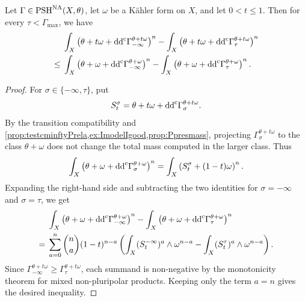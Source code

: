 \begin{lemma}\label{lma:NA_mass_drop_transition}
    Let $\Gamma\in \mathrm{PSH}^{\mathrm{NA}}(X,\theta)$, let $\omega$ be a Kähler form on $X$, and let $0<t\leq 1$. Then for every $\tau<\Gamma_{\max}$, we have
    \[
    \begin{aligned}
    &\int_X \left(\theta+t\omega+\mathrm{dd}^{\mathrm{c}}\Gamma^{\theta+t\omega}_{-\infty}\right)^n-\int_X \left(\theta+t\omega+\mathrm{dd}^{\mathrm{c}}\Gamma^{\theta+t\omega}_{\tau}\right)^n\\
    \leq{}&\int_X \left(\theta+\omega+\mathrm{dd}^{\mathrm{c}}\Gamma^{\theta+\omega}_{-\infty}\right)^n-\int_X \left(\theta+\omega+\mathrm{dd}^{\mathrm{c}}\Gamma^{\theta+\omega}_{\tau}\right)^n.
    \end{aligned}
    \]
\end{lemma}
\begin{proof}
    For $\sigma\in\{-\infty,\tau\}$, put
    \[
        S_t^\sigma=\theta+t\omega+\mathrm{dd}^{\mathrm{c}}\Gamma^{\theta+t\omega}_{\sigma}.
    \]
    By the transition compatibility and \cref{prop:testcminftyPrela,ex:ImodelIgood,prop:Ppresmass}, projecting $\Gamma^{\theta+t\omega}_{\sigma}$ to the class $\theta+\omega$ does not change the total mass computed in the larger class. Thus
    \[
    \int_X \left(\theta+\omega+\mathrm{dd}^{\mathrm{c}}\Gamma^{\theta+\omega}_{\sigma}\right)^n
    =
    \int_X \left(S_t^\sigma+(1-t)\omega\right)^n.
    \]
    Expanding the right-hand side and subtracting the two identities for $\sigma=-\infty$ and $\sigma=\tau$, we get
    \[
    \begin{aligned}
    &\int_X \left(\theta+\omega+\mathrm{dd}^{\mathrm{c}}\Gamma^{\theta+\omega}_{-\infty}\right)^n-\int_X \left(\theta+\omega+\mathrm{dd}^{\mathrm{c}}\Gamma^{\theta+\omega}_{\tau}\right)^n\\
    ={}&\sum_{a=0}^n \binom{n}{a}(1-t)^{n-a}
    \left(\int_X (S_t^{-\infty})^a\wedge\omega^{n-a}-\int_X (S_t^\tau)^a\wedge\omega^{n-a}\right).
    \end{aligned}
    \]
    Since $\Gamma^{\theta+t\omega}_{-\infty}\geq \Gamma^{\theta+t\omega}_{\tau}$, each summand is non-negative by the monotonicity theorem for mixed non-pluripolar products. Keeping only the term $a=n$ gives the desired inequality.
\end{proof}

